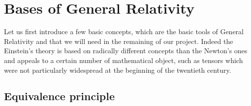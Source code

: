 \section{Bases of General Relativity}

Let us first introduce a few basic concepts, which are the basic tools of General Relativity and that we will need in the remaining
of our project. Indeed the Einstein’s theory is based on radically
different concepts than the Newton’s ones and appeals to a certain number of mathematical object, such as tensors
which were not particularly widespread at the beginning of the twentieth century.

\subsection{Equivalence principle}

